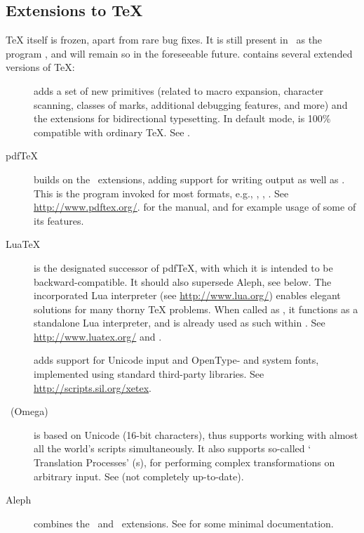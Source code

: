 \documentclass{article}
\begin{document}
\subsection{Extensions to \protect\TeX}
\label{sec:tex-extensions}

\TeX{} itself is frozen, apart from rare bug fixes. It is still present
in \TL\ as the program , and will remain so in the
foreseeable future.  \TL{} contains several extended versions of \TeX:

\begin{description}

\item [\eTeX] adds a set of new primitives
\label{text:etex} (related to macro expansion, character scanning,
classes of marks, additional debugging features, and more) and the
\TeXXeT{} extensions for bidirectional typesetting.  In default mode,
\eTeX{} is 100\% compatible with ordinary \TeX. See
.

\item [pdf\TeX] builds on the \eTeX\ extensions, adding support for
writing  output as well as \dvi{}.  This is the program
invoked for most formats, e.g., , ,
.  See \url{http://www.pdftex.org/}.
 for the manual, and
 for example usage
of some of its features.

\item [Lua\TeX] is the designated successor of pdf\TeX, with which it
is intended to be backward-compatible. It should also supersede Aleph,
see below. The incorporated Lua interpreter (see
\url{http://www.lua.org/}) enables elegant solutions for many thorny
\TeX{} problems. When called as , it functions as a
standalone Lua interpreter, and is already used as such within \TL.  See
\url{http://www.luatex.org/} and
.

\item [\XeTeX] adds support for Unicode input and OpenType- and system
fonts, implemented using standard third-party libraries.  See
\url{http://scripts.sil.org/xetex}.

\item [\OMEGA\ (Omega)] is based on Unicode (16-bit characters), thus
supports working with almost all the world's scripts simultaneously. It
also supports so-called `\OMEGA{} Translation Processes' (s),
for performing complex transformations on arbitrary input. See
 (not completely up-to-date).

\item [Aleph] combines the \OMEGA\ and \eTeX\ extensions.
See  for some minimal documentation.

\end{description}
\end{document}
